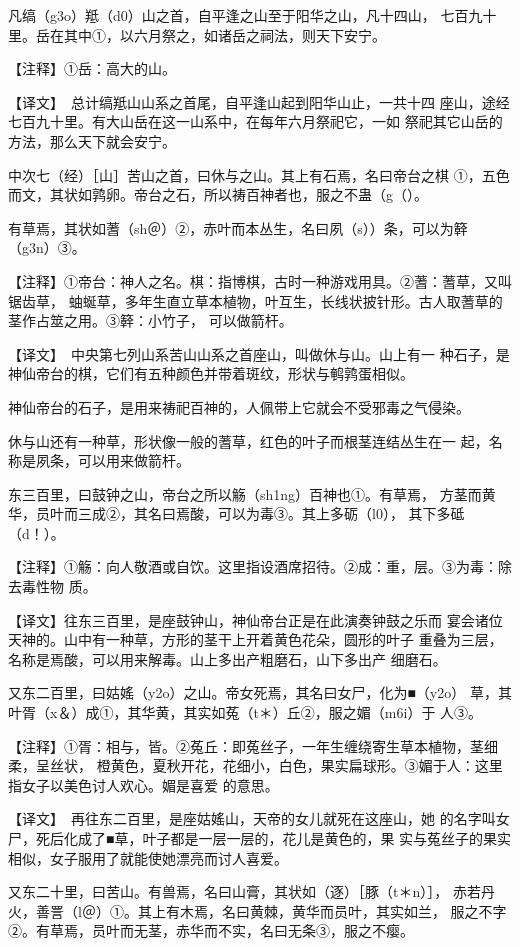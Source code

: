 \documentclass[a4paper,12pt,UTF8,twoside]{ctexbook}
\begin{document}
凡缟（g3o）羝（d0）山之首，自平逢之山至于阳华之山，凡十四山， 七百九十里。岳在其中①，以六月祭之，如诸岳之祠法，则天下安宁。

【注释】①岳：高大的山。

【译文】　总计缟羝山山系之首尾，自平逢山起到阳华山止，一共十四 座山，途经七百九十里。有大山岳在这一山系中，在每年六月祭祀它，一如 祭祀其它山岳的方法，那么天下就会安宁。

中次七（经）［山］苦山之首，曰休与之山。其上有石焉，名曰帝台之棋 ①，五色而文，其状如鹑卵。帝台之石，所以祷百神者也，服之不蛊（g（）。

有草焉，其状如蓍（sh＠）②，赤叶而本丛生，名曰夙（s））条，可以为簳 （g3n）③。

【注释】①帝台：神人之名。棋：指博棋，古时一种游戏用具。②蓍：蓍草，又叫锯齿草， 蚰蜒草，多年生直立草本植物，叶互生，长线状披针形。古人取蓍草的茎作占筮之用。③簳：小竹子， 可以做箭杆。

【译文】　中央第七列山系苦山山系之首座山，叫做休与山。山上有一 种石子，是神仙帝台的棋，它们有五种颜色并带着斑纹，形状与鹌鹑蛋相似。

神仙帝台的石子，是用来祷祀百神的，人佩带上它就会不受邪毒之气侵染。

休与山还有一种草，形状像一般的蓍草，红色的叶子而根茎连结丛生在一 起，名称是夙条，可以用来做箭杆。

东三百里，曰鼓钟之山，帝台之所以觞（sh1ng）百神也①。有草焉， 方茎而黄华，员叶而三成②，其名曰焉酸，可以为毒③。其上多砺（l0）， 其下多砥（d！）。

【注释】①觞：向人敬酒或自饮。这里指设酒席招待。②成：重，层。③为毒：除去毒性物 质。

【译文】往东三百里，是座鼓钟山，神仙帝台正是在此演奏钟鼓之乐而 宴会诸位天神的。山中有一种草，方形的茎干上开着黄色花朵，圆形的叶子 重叠为三层，名称是焉酸，可以用来解毒。山上多出产粗磨石，山下多出产 细磨石。

又东二百里，曰姑媱（y2o）之山。帝女死焉，其名曰女尸，化为■（y2o） 草，其叶胥（x＆）成①，其华黄，其实如菟（t＊）丘②，服之媚（m6i）于 人③。

【注释】①胥：相与，皆。②菟丘：即菟丝子，一年生缠绕寄生草本植物，茎细柔，呈丝状， 橙黄色，夏秋开花，花细小，白色，果实扁球形。③媚于人：这里指女子以美色讨人欢心。媚是喜爱 的意思。

【译文】　再往东二百里，是座姑媱山，天帝的女儿就死在这座山，她 的名字叫女尸，死后化成了■草，叶子都是一层一层的，花儿是黄色的，果 实与菟丝子的果实相似，女子服用了就能使她漂亮而讨人喜爱。

又东二十里，曰苦山。有兽焉，名曰山膏，其状如（逐）［豚（t＊n）］， 赤若丹火，善詈（l＠）①。其上有木焉，名曰黄棘，黄华而员叶，其实如兰， 服之不字②。有草焉，员叶而无茎，赤华而不实，名曰无条③，服之不瘿。
\end{document}
